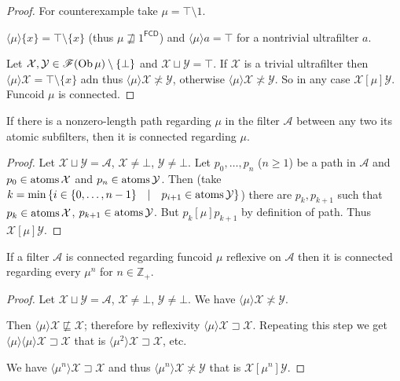 \begin{proof}
  For counterexample take $\mu = \top \setminus 1$.

  $\langle \mu \rangle \{ x \} = \top \setminus \{ x \}$ (thus $\mu
  \mathrel{\nsqsupseteq} 1^{\mathsf{FCD}}$) and $\langle \mu
  \rangle a = \top$ for a nontrivial ultrafilter $a$.

  Let $\mathcal{X}, \mathcal{Y} \in \mathscr{F} (\operatorname{Ob} \mu) \setminus \{
  \bot \}$ and $\mathcal{X} \sqcup \mathcal{Y} = \top$. If $\mathcal{X}$ is a
  trivial ultrafilter then $\langle \mu \rangle \mathcal{X} = \top \setminus
  \{ x \}$ adn thus $\langle \mu \rangle \mathcal{X} \nasymp \mathcal{Y}$,
  otherwise $\langle \mu \rangle \mathcal{X} \nasymp \mathcal{Y}$. So in any
  case $\mathcal{X} \mathrel{[\mu]} \mathcal{Y}$. Funcoid $\mu$ is connected.
\end{proof}

\begin{prop}
  If there is a nonzero-length path regarding $\mu$ in the filter
  $\mathcal{A}$ between any two its atomic subfilters, then it is connected
  regarding $\mu$.
\end{prop}

\begin{proof}
  Let $\mathcal{X} \sqcup \mathcal{Y} = \mathcal{A}$, $\mathcal{X} \neq \bot$,
  $\mathcal{Y} \neq \bot$. Let $p_0, \ldots, p_n$ ($n \geq 1$) be a path in
  $\mathcal{A}$ and $p_0 \in \operatorname{atoms} \mathcal{X}$ and $p_n \in
  \operatorname{atoms} \mathcal{Y}$. Then (take $k = \min \left\{ i \in \{ 0, \ldots,
  n - 1 \} \hspace{1em} | \hspace{1em} p_{i + 1} \in \operatorname{atoms} \mathcal{Y}
  \right\}$) there are $p_k, p_{k + 1}$ such that $p_k \in \operatorname{atoms}
  \mathcal{X}$, $p_{k + 1} \in \operatorname{atoms} \mathcal{Y}$. But $p_k
  \mathrel{[\mu]} p_{k + 1}$ by definition of path. Thus $\mathcal{X}
  \mathrel{[\mu]} \mathcal{Y}$.
\end{proof}

\begin{prop}
  If a filter $\mathcal{A}$ is connected regarding funcoid $\mu$ reflexive on
  $\mathcal{A}$ then it is connected regarding every $\mu^n$ for $n \in
  \mathbb{Z}_+$.
\end{prop}

\begin{proof}
  Let $\mathcal{X} \sqcup \mathcal{Y} = \mathcal{A}$, $\mathcal{X} \neq \bot$,
  $\mathcal{Y} \neq \bot$. We have $\langle \mu \rangle \mathcal{X} \nasymp
  \mathcal{Y}$.

  Then $\langle \mu \rangle \mathcal{X} \mathrel{\nsqsubseteq}
  \mathcal{X}$; therefore by reflexivity $\langle \mu \rangle \mathcal{X}
  \sqsupset \mathcal{X}$. Repeating this step we get $\langle \mu \rangle
  \langle \mu \rangle \mathcal{X} \sqsupset \mathcal{X}$ that is $\langle
  \mu^2 \rangle \mathcal{X} \sqsupset \mathcal{X}$, etc.

  We have $\langle \mu^n \rangle \mathcal{X} \sqsupset \mathcal{X}$ and thus
  $\langle \mu^n \rangle \mathcal{X} \nasymp \mathcal{Y}$ that is $\mathcal{X}
  \mathrel{[\mu^n]} \mathcal{Y}$.
\end{proof}

